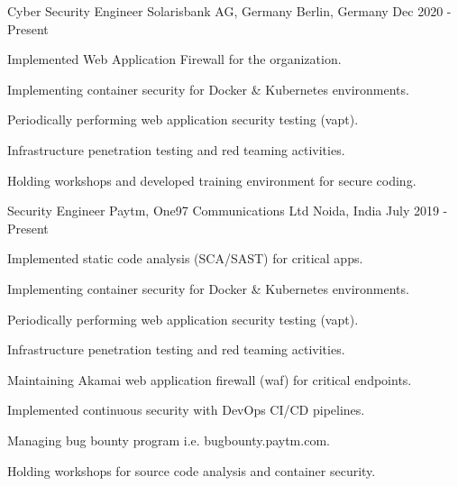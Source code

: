 
\begin{cventries}

\cventry
    {Cyber Security Engineer} %
    {Solarisbank AG, Germany} %
    {Berlin, Germany} %
    {Dec 2020 - Present} %
    {
      \begin{cvitems} %
        \item {Implemented Web Application Firewall for the organization.}
        \item {Implementing container security for Docker \& Kubernetes environments.}
        \item {Periodically performing web application security testing (vapt).}
        \item {Infrastructure penetration testing and red teaming activities.}
        \item {Holding workshops and developed training environment for secure coding.}
      \end{cvitems}
    }

  \cventry
    {Security Engineer} %
    {Paytm, One97 Communications Ltd} %
    {Noida, India} %
    {July 2019 - Present} %
    {
      \begin{cvitems} %
        \item {Implemented static code analysis (SCA/SAST) for critical apps.}
        \item {Implementing container security for Docker \& Kubernetes environments.}
        \item {Periodically performing web application security testing (vapt).}
        \item {Infrastructure penetration testing and red teaming activities.}
        \item {Maintaining Akamai web application firewall (waf) for critical endpoints.}
        \item {Implemented continuous security with DevOps CI/CD pipelines.}
        \item {Managing bug bounty program i.e. bugbounty.paytm.com.}
        \item {Holding workshops for source code analysis and container security.}
      \end{cvitems}
    }


\end{cventries}
